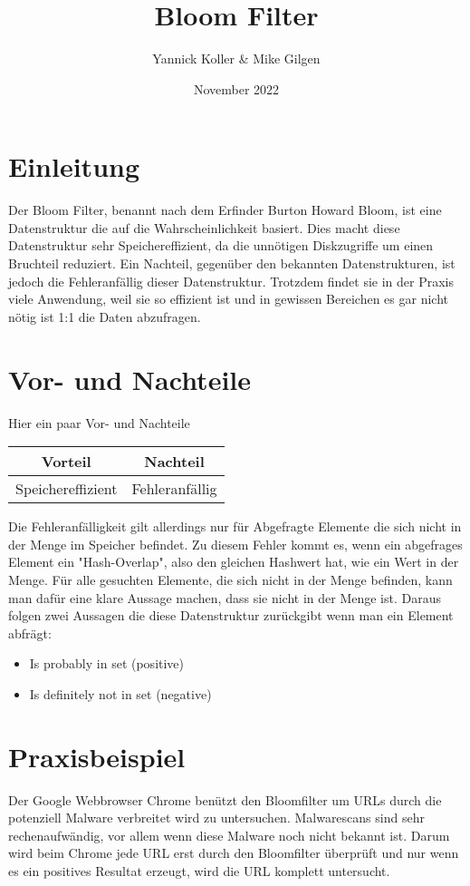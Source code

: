\documentclass{article}
\title{Bloom Filter}
\author{ Yannick Koller & Mike Gilgen }
\date{November 2022}
\begin{document}
\maketitle

\section{Einleitung}
Der Bloom Filter, benannt nach dem Erfinder Burton Howard Bloom, ist eine Datenstruktur die auf die Wahrscheinlichkeit basiert. Dies macht diese Datenstruktur sehr Speichereffizient, da die unnötigen Diskzugriffe um einen Bruchteil reduziert. Ein Nachteil, gegenüber den bekannten Datenstrukturen, ist jedoch die Fehleranfällig dieser Datenstruktur. Trotzdem findet sie in der Praxis viele Anwendung, weil sie so effizient ist und in gewissen Bereichen es gar nicht nötig ist 1:1 die Daten abzufragen.

\section{Vor- und Nachteile}
Hier ein paar Vor- und Nachteile
\begin{center}
\begin{tabular}{c|c}
    Vorteil & Nachteil \\
    \hline
    Speichereffizient & Fehleranfällig \\
\end{tabular}
\end{center}
Die Fehleranfälligkeit gilt allerdings nur für Abgefragte Elemente die sich nicht in der Menge im Speicher befindet. Zu diesem Fehler kommt es, wenn ein abgefrages Element ein "Hash-Overlap", also den gleichen Hashwert hat, wie ein Wert in der Menge. Für alle gesuchten Elemente, die sich nicht in der Menge befinden, kann man dafür eine klare Aussage machen, dass sie nicht in der Menge ist. Daraus folgen zwei Aussagen die diese Datenstruktur zurückgibt wenn man ein Element abfrägt:

\begin{itemize}
    \item Is probably in set (positive)
    \item Is definitely not in set (negative)
\end{itemize}

\clearpage

\section{Praxisbeispiel}
Der Google Webbrowser Chrome benützt den Bloomfilter um URLs durch die potenziell Malware verbreitet wird zu untersuchen. Malwarescans sind sehr rechenaufwändig, vor allem wenn diese Malware noch nicht bekannt ist. Darum wird beim Chrome jede URL erst durch den Bloomfilter überprüft und nur wenn es ein positives Resultat erzeugt, wird die URL komplett untersucht.
\end{document}
